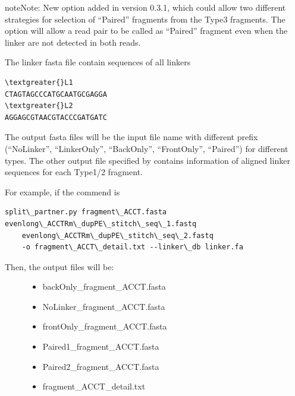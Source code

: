 \documentclass[letterpaper,10pt,english]{sphinxmanual}
\begin{document}
\begin{notice}{note}{Note:}
New option added in version 0.3.1, which could allow two different strategies for selection of ``Paired'' fragments from the Type3 fragments. The  option will allow a read pair to be called as ``Paired'' fragment even when the linker are not detected in both reads.
\end{notice}

The linker fasta file contain sequences of all linkers

\begin{Verbatim}[commandchars=\\\{\}]
\textgreater{}L1
CTAGTAGCCCATGCAATGCGAGGA
\textgreater{}L2
AGGAGCGTAACGTACCCGATGATC
\end{Verbatim}

The output fasta files will be the input file name with different prefix (``NoLinker'', ``LinkerOnly'', ``BackOnly'', ``FrontOnly'', ``Paired'') for different types. The other output file specified by  contains information of aligned linker sequences for each Type1/2 fragment.

For example, if the commend is

\begin{Verbatim}[commandchars=\\\{\}]
split\_partner.py fragment\_ACCT.fasta evenlong\_ACCTRm\_dupPE\_stitch\_seq\_1.fastq
    evenlong\_ACCTRm\_dupPE\_stitch\_seq\_2.fastq
    -o fragment\_ACCT\_detail.txt --linker\_db linker.fa
\end{Verbatim}
\begin{description}
\item[{Then, the output files will be:}] \leavevmode\begin{itemize}
\item {} 
backOnly\_fragment\_ACCT.fasta

\item {} 
NoLinker\_fragment\_ACCT.fasta

\item {} 
frontOnly\_fragment\_ACCT.fasta

\item {} 
Paired1\_fragment\_ACCT.fasta

\item {} 
Paired2\_fragment\_ACCT.fasta

\item {} 
fragment\_ACCT\_detail.txt

\end{itemize}

\end{description}
\end{document}
